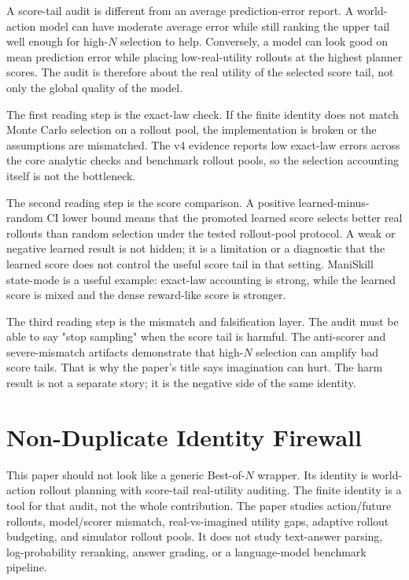 A score-tail audit is different from an average prediction-error report. A
world-action model can have moderate average error while still ranking the
upper tail well enough for high-$N$ selection to help. Conversely, a model can
look good on mean prediction error while placing low-real-utility rollouts at
the highest planner scores. The audit is therefore about the real utility of
the selected score tail, not only the global quality of the model.

The first reading step is the exact-law check. If the finite identity does not
match Monte Carlo selection on a rollout pool, the implementation is broken or
the assumptions are mismatched. The v4 evidence reports low exact-law errors
across the core analytic checks and benchmark rollout pools, so the selection
accounting itself is not the bottleneck.

The second reading step is the score comparison. A positive learned-minus-random
CI lower bound means that the promoted learned score selects better real
rollouts than random selection under the tested rollout-pool protocol. A weak
or negative learned result is not hidden; it is a limitation or a diagnostic
that the learned score does not control the useful score tail in that setting.
ManiSkill state-mode is a useful example: exact-law accounting is strong, while
the learned score is mixed and the dense reward-like score is stronger.

The third reading step is the mismatch and falsification layer. The audit must
be able to say "stop sampling" when the score tail is harmful. The anti-scorer
and severe-mismatch artifacts demonstrate that high-$N$ selection can amplify
bad score tails. That is why the paper's title says imagination can hurt. The
harm result is not a separate story; it is the negative side of the same
identity.

\section{Non-Duplicate Identity Firewall}
\label{app:identity-firewall}

This paper should not look like a generic Best-of-$N$ wrapper. Its identity is
world-action rollout planning with score-tail real-utility auditing. The
finite identity is a tool for that audit, not the whole contribution. The
paper studies action/future rollouts, model/scorer mismatch, real-vs-imagined
utility gaps, adaptive rollout budgeting, and simulator rollout pools. It does
not study text-answer parsing, log-probability reranking, answer grading, or a
language-model benchmark pipeline.

